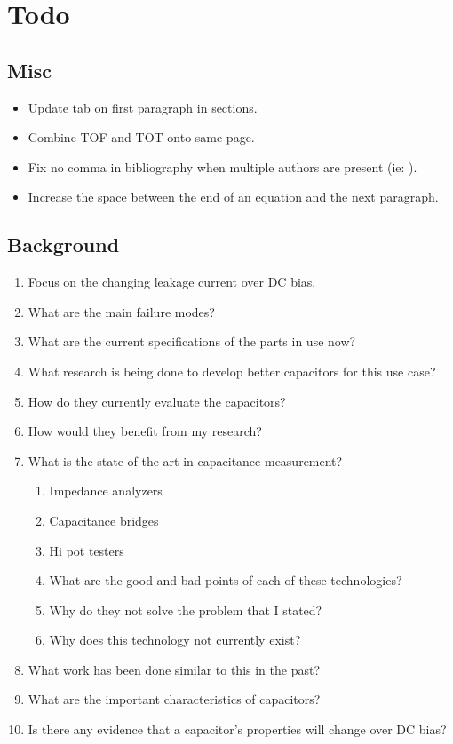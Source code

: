 \documentclass{article}
\begin{document}
\section{Todo}

\subsection{Misc}
\begin{itemize}
    \item Update tab on first paragraph in sections.
    \item Combine TOF and TOT onto same page.
    \item Fix no comma in bibliography when multiple authors are present (ie: \cite{absCircuit}).
    \item Increase the space between the end of an equation and the next paragraph.
\end{itemize}

\subsection{Background}
\begin {enumerate}
    \item Focus on the changing leakage current over DC bias.
    \item What are the main failure modes?
    \item What are the current specifications of the parts in use now?
    \item What research is being done to develop better capacitors for this use case?
    \item How do they currently evaluate the capacitors?
    \item How would they benefit from my research?
    \item What is the state of the art in capacitance measurement?
    \begin {enumerate}
        \item Impedance analyzers
        \item Capacitance bridges
        \item Hi pot testers
        \item What are the good and bad points of each of these technologies?
        \item Why do they not solve the problem that I stated? 
        \item Why does this technology not currently exist?
    \end {enumerate}
    \item What work has been done similar to this in the past?
    \item What are the important characteristics of capacitors?
    \item Is there any evidence that a capacitor's properties will change over DC bias?
\end {enumerate}
\end{document}
